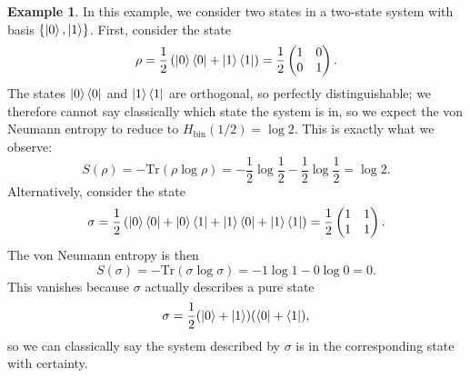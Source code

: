 \documentclass[12pt,a4paper]{report}
\numberwithin{equation}{section}
\newcommand{\ketbra}[2]{\ket{#1}\bra{#2}}
\newcommand{\ketbras}[1]{\ketbra{#1}{#1}}
\newcommand{\tr}{\text{Tr}}
\theoremstyle{definition}
\theoremstyle{theorem}
\theoremstyle{theorem}
\theoremstyle{example}
\newtheorem{example}{Example}[section]
\theoremstyle{definition}
\begin{document}
\begin{example}
	In this example, we consider two states in a two-state system with basis $\{\ket{0},\ket{1}\}$. First, consider the state
	\begin{equation}
		\rho=\frac{1}{2}\left(\ketbras{0}+\ketbras{1}\right)=\frac{1}{2}\begin{pmatrix}
			1&0\\0&1
		\end{pmatrix}.
	\end{equation}
	The states $\ketbras{0}$ and $\ketbras{1}$ are orthogonal, so perfectly distinguishable; we therefore cannot say classically which state the system is in, so we expect the von Neumann entropy to reduce to $H_{\text{bin}}(1/2)=\log{2}$. This is exactly what we observe:
	\begin{equation}
		S(\rho)=-\tr(\rho\log\rho)=-\frac{1}{2}\log\frac{1}{2}-\frac{1}{2}\log\frac{1}{2}=\log{2}.
	\end{equation}
	Alternatively, consider the state
	\begin{equation}
		\sigma=\frac{1}{2}\left(\ketbras{0}+\ketbra{0}{1}+\ketbra{1}{0}+\ketbras{1}\right)=\frac{1}{2}\begin{pmatrix}
			1&1\\1&1
		\end{pmatrix}.
	\end{equation}
	The von Neumann entropy is then
	\begin{equation}
		S(\sigma)=-\tr(\sigma\log\sigma)=-1\log{1}-0\log{0}=0.
	\end{equation}
	This vanishes because $\sigma$ actually describes a pure state
	\begin{equation}
		\sigma=\frac{1}{2}(\ket{0}+\ket{1})(\bra{0}+\bra{1}),
	\end{equation}
	so we can classically say the system described by $\sigma$ is in the corresponding state with certainty.
\end{example}
\end{document}
